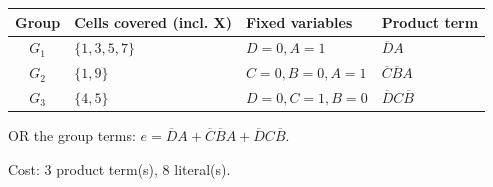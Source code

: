 \documentclass[a4paper,11pt]{article}
\begin{document}
\begin{minipage}{\textwidth}
\begin{center}\small
\begin{tabular}{clll}
\toprule
Group & Cells covered (incl. X) & Fixed variables & Product term\\\midrule
\textcolor{blue!75!black}{$G_{1}$} & $\{1,3,5,7\}$ & $D=0,A=1$ & $\overline{D}A$\\
\textcolor{red!75!black}{$G_{2}$} & $\{1,9\}$ & $C=0,B=0,A=1$ & $\overline{C}\overline{B}A$\\
\textcolor{teal!80!black}{$G_{3}$} & $\{4,5\}$ & $D=0,C=1,B=0$ & $\overline{D}C\overline{B}$\\
\bottomrule\end{tabular}\end{center}


\noindent OR the group terms: $\boxed{e=\overline{D}A + \overline{C}\overline{B}A + \overline{D}C\overline{B}}$.

\noindent Cost: 3 product term(s), 8 literal(s).

\end{minipage}\par\vspace{0.25cm}
\end{document}
